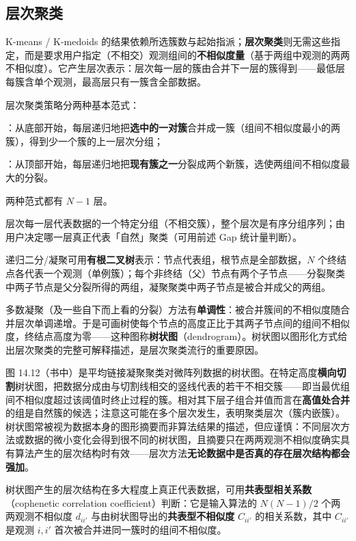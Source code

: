 \subsection{层次聚类}

K-means / K-medoids 的结果依赖所选簇数与起始指派；\textbf{层次聚类}则无需这些指定，而是要求用户指定（不相交）观测组间的\textbf{不相似度量}（基于两组中观测的两两不相似度）。它产生层次表示：层次每一层的簇由合并下一层的簇得到——最低层每簇含单个观测，最高层只有一簇含全部数据。

层次聚类策略分两种基本范式：
\begin{description}[itemsep=1pt]
\item[\textbf{凝聚}（agglomerative，自下而上）]：从底部开始，每层递归地把\textbf{选中的一对簇}合并成一簇（组间不相似度最小的两簇），得到少一个簇的上一层次分组；
\item[\textbf{分裂}（divisive，自上而下）]：从顶部开始，每层递归地把\textbf{现有簇之一}分裂成两个新簇，选使两组间不相似度最大的分裂。
\end{description}
两种范式都有 $N-1$ 层。

层次每一层代表数据的一个特定分组（不相交簇），整个层次是有序分组序列；由用户决定哪一层真正代表「自然」聚类（可用前述 Gap 统计量判断）。

递归二分/凝聚可用\textbf{有根二叉树}表示：节点代表组，根节点是全部数据，$N$ 个终结点各代表一个观测（单例簇）；每个非终结（父）节点有两个子节点——分裂聚类中两子节点是父分裂所得的两组，凝聚聚类中两子节点是被合并成父的两组。

多数凝聚（及一些自下而上看的分裂）方法有\textbf{单调性}：被合并簇间的不相似度随合并层次单调递增。于是可画树使每个节点的高度正比于其两子节点间的组间不相似度，终结点高度为零——这种图称\textbf{树状图}（dendrogram）。树状图以图形化方式给出层次聚类的完整可解释描述，是层次聚类流行的重要原因。

图 14.12（书中）是平均链接凝聚聚类对微阵列数据的树状图。在特定高度\textbf{横向切割}树状图，把数据分成由与切割线相交的竖线代表的若干不相交簇——即当最优组间不相似度超过该阈值时终止过程的簇。相对其下层子组合并值而言在\textbf{高值处合并}的组是自然簇的候选；注意这可能在多个层次发生，表明聚类层次（簇内嵌簇）。树状图常被视为数据本身的图形摘要而非算法结果的描述，但应谨慎：不同层次方法或数据的微小变化会得到很不同的树状图，且摘要只在两两观测不相似度确实具有算法产生的层次结构时有效——层次方法\textbf{无论数据中是否真的存在层次结构都会强加}。

树状图产生的层次结构在多大程度上真正代表数据，可用\textbf{共表型相关系数}（cophenetic correlation coefficient）判断：它是输入算法的 $N(N-1)/2$ 个两两观测不相似度 $d_{ii'}$ 与由树状图导出的\textbf{共表型不相似度} $C_{ii'}$ 的相关系数，其中 $C_{ii'}$ 是观测 $i,i'$ 首次被合并进同一簇时的组间不相似度。

